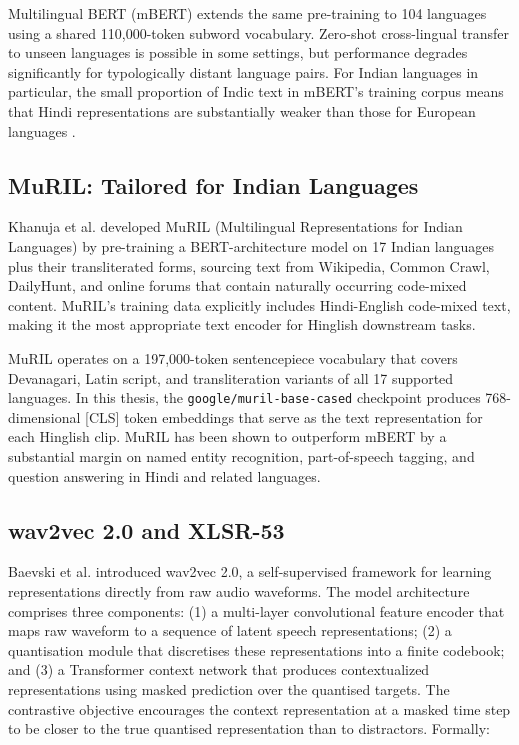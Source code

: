 Multilingual BERT (mBERT) extends the same pre-training to 104 languages using a shared 110,000-token subword vocabulary. Zero-shot cross-lingual transfer to unseen languages is possible in some settings, but performance degrades significantly for typologically distant language pairs. For Indian languages in particular, the small proportion of Indic text in mBERT's training corpus means that Hindi representations are substantially weaker than those for European languages \cite{khanuja2021muril}.

\subsection{MuRIL: Tailored for Indian Languages}

Khanuja et al. \cite{khanuja2021muril} developed MuRIL (Multilingual Representations for Indian Languages) by pre-training a BERT-architecture model on 17 Indian languages plus their transliterated forms, sourcing text from Wikipedia, Common Crawl, DailyHunt, and online forums that contain naturally occurring code-mixed content. MuRIL's training data explicitly includes Hindi-English code-mixed text, making it the most appropriate text encoder for Hinglish downstream tasks.

MuRIL operates on a 197,000-token sentencepiece vocabulary that covers Devanagari, Latin script, and transliteration variants of all 17 supported languages. In this thesis, the \texttt{google/muril-base-cased} checkpoint produces 768-dimensional [CLS] token embeddings that serve as the text representation for each Hinglish clip. MuRIL has been shown to outperform mBERT by a substantial margin on named entity recognition, part-of-speech tagging, and question answering in Hindi and related languages.

\subsection{wav2vec 2.0 and XLSR-53}

Baevski et al. \cite{baevski2020wav2vec} introduced wav2vec 2.0, a self-supervised framework for learning representations directly from raw audio waveforms. The model architecture comprises three components: (1) a multi-layer convolutional feature encoder that maps raw waveform to a sequence of latent speech representations; (2) a quantisation module that discretises these representations into a finite codebook; and (3) a Transformer context network that produces contextualized representations using masked prediction over the quantised targets. The contrastive objective encourages the context representation at a masked time step to be closer to the true quantised representation than to distractors. Formally:

